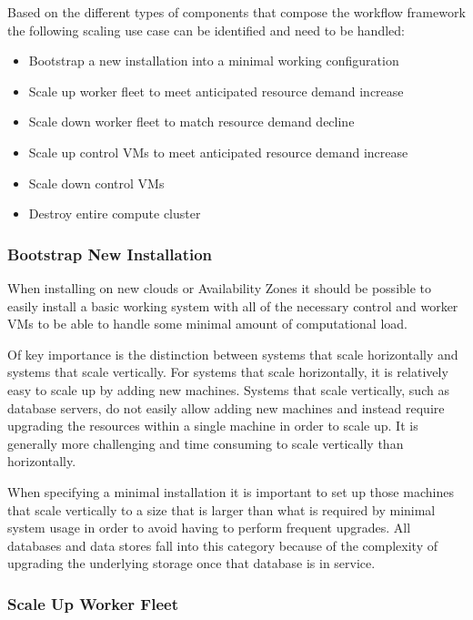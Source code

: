 Based on the different types of components that compose the workflow framework the following scaling use case can be identified and need to be handled:

\begin{itemize}
\item Bootstrap a new installation into a minimal working configuration
\item Scale up worker fleet to meet anticipated resource demand increase
\item Scale down worker fleet to match resource demand decline
\item Scale up control VMs to meet anticipated resource demand increase
\item Scale down control VMs
\item Destroy entire compute cluster
\end{itemize}

\subsubsection {Bootstrap New Installation}

When installing on new clouds or Availability Zones it should be possible to easily install a basic working system with all of the necessary control and worker VMs to be able to handle some minimal amount of computational load. 

Of key importance is the distinction between systems that scale horizontally and systems that scale vertically. For systems that scale horizontally, it is relatively easy to scale up by adding new machines. Systems that scale vertically, such as database servers, do not easily allow adding new machines and instead require upgrading the resources within a single machine in order to scale up. It is generally more challenging and time consuming to scale vertically than horizontally.

When specifying a minimal installation it is important to set up those machines that scale vertically to a size that is larger than what is required by minimal system usage in order to avoid having to perform frequent upgrades. All databases and data stores fall into this category because of the complexity of upgrading the underlying storage once that database is in service.

\subsubsection {Scale Up Worker Fleet}

